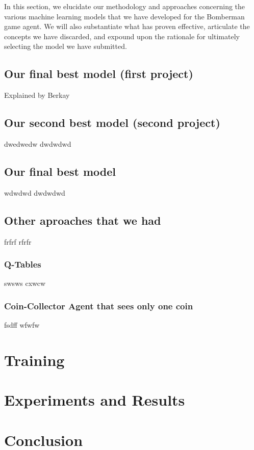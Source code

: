 \documentclass[a4paper,12pt,headsepline, fleqn, english]{scrartcl}%
\begin{document}
	In this section, we elucidate our methodology and approaches concerning the various machine learning models 
	that we have developed for the Bomberman game agent. We will also substantiate what has proven effective, articulate 
	the concepts we have discarded, and expound upon the rationale for ultimately selecting the model we have submitted.

	\subsection{Our final best model (first project)}
	
	Explained by Berkay

	\subsection{Our second best model (second project)}
	dwedwedw
	dwdwdwd

	\subsection{Our final best model}
	wdwdwd
	dwdwdwd

	\subsection{Other aproaches that we had}
	frfrf
	rfrfr

	\subsubsection{Q-Tables}
	swsws
	cxwcw
	
	\subsubsection{Coin-Collector Agent that sees only one coin}
	fsdff
	wfwfw
	
	\section{Training}
	
	\section{Experiments and Results}
	
	\section{Conclusion}
	
	\newpage	
	
	\printbibliography
\end{document}
